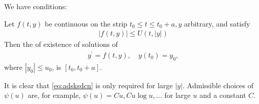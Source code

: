 \documentclass{article}
\begin{document}
\begin{thma}\label{thm:ijcnad}
We have conditions:

Let $f(t, y)$ be continuous on the strip $t_{0} \le t \le t_{0}+a, y$ arbitrary, and satisfy
\begin{align}
|f(t, y)| \le U(t,|y|)\label{eq:adsksdcn}
\end{align}
Then the  of existence of solutions of
\begin{align}
y^{\prime}=f(t, y), \quad y\left(t_{0}\right)=y_{0}, \label{eq:gadc}
\end{align}
where $\left|y_{0}\right| \le u_{0}$, is $\left[t_{0}, t_{0}+a\right]$.
\end{thma}
\begin{rema}
It is clear that \cref{eq:adsksdcn} is only required for large $|y|$. Admissible choices of $\psi(u)$ are, for example, $\psi(u)=C u, C u \log u, \ldots$ for large $u$ and a constant $C$.
\end{rema}
\end{document}
